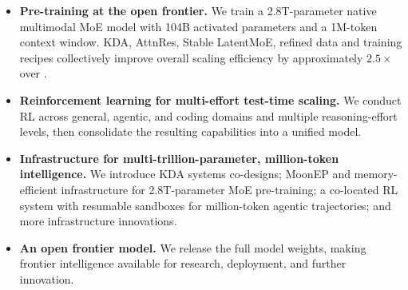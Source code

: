 \begin{itemize}[leftmargin=12pt, topsep=0pt]
    \item \textbf{Pre-training at the open frontier.}
          We train a 2.8T-parameter native multimodal MoE model with 104B activated parameters and a 1M-token context window.
          KDA, AttnRes, Stable LatentMoE, refined data and training recipes collectively improve overall scaling efficiency by approximately $2.5\times$ over .

    \item \textbf{Reinforcement learning for multi-effort test-time scaling.}
          We conduct RL across general, agentic, and coding domains and multiple reasoning-effort levels, then consolidate the resulting capabilities into a unified model.

    \item \textbf{Infrastructure for multi-trillion-parameter, million-token intelligence.}
          We introduce KDA systems co-designs; MoonEP and memory-efficient infrastructure for 2.8T-parameter MoE pre-training; a co-located RL system with resumable sandboxes for million-token agentic trajectories; and more infrastructure innovations.

    \item \textbf{An open frontier model.}
          We release the full  model weights, making frontier intelligence available for research, deployment, and further innovation.

\end{itemize}
